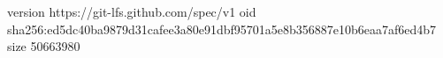 version https://git-lfs.github.com/spec/v1
oid sha256:ed5dc40ba9879d31cafee3a80e91dbf95701a5e8b356887e10b6eaa7af6ed4b7
size 50663980
